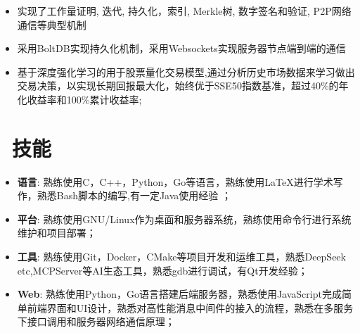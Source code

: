 \documentclass{resume}
\begin{document}
\begin{itemize}[parsep=0.5ex]
    \item 实现了工作量证明, 迭代, 持久化，索引, Merkle树, 数字签名和验证, P2P网络通信等典型机制
    \item 采用BoltDB实现持久化机制，采用Websockets实现服务器节点端到端的通信
\end{itemize}

\begin{itemize}[parsep=0.5ex]
    \item 基于深度强化学习的用于股票量化交易模型,通过分析历史市场数据来学习做出交易决策，以实现长期回报最大化，始终优于SSE50指数基准，超过40\%的年化收益率和100\%累计收益率;
\end{itemize}


\section{\faCogs\ 技能}
\begin{itemize}[parsep=0.5ex]
  \item \textbf{语言}: 熟练使用C，C++，Python，Go等语言，熟练使用LaTeX进行学术写作，熟悉Bash脚本的编写,有一定Java使用经验
  ；
  \item \textbf{平台}: 熟练使用GNU/Linux作为桌面和服务器系统，熟练使用命令行进行系统维护和项目部署；
  \item \textbf{工具}: 熟练使用Git，Docker，CMake等项目开发和运维工具，熟悉DeepSeek 
 etc,MCPServer等AI生态工具，熟悉gdb进行调试，有Qt开发经验；
  \item \textbf{Web}: 熟练使用Python，Go语言搭建后端服务器，熟悉使用JavaScript完成简单前端界面和UI设计，熟悉对高性能消息中间件的接入的流程，熟悉在多服务下接口调用和服务器网络通信原理；
\end{itemize}
\end{document}
